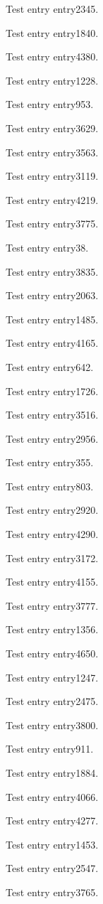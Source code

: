 Test entry \gls{entry2345}.

Test entry \gls{entry1840}.

Test entry \gls{entry4380}.

Test entry \gls{entry1228}.

Test entry \gls{entry953}.

Test entry \gls{entry3629}.

Test entry \gls{entry3563}.

Test entry \gls{entry3119}.

Test entry \gls{entry4219}.

Test entry \gls{entry3775}.

Test entry \gls{entry38}.

Test entry \gls{entry3835}.

Test entry \gls{entry2063}.

Test entry \gls{entry1485}.

Test entry \gls{entry4165}.

Test entry \gls{entry642}.

Test entry \gls{entry1726}.

Test entry \gls{entry3516}.

Test entry \gls{entry2956}.

Test entry \gls{entry355}.

Test entry \gls{entry803}.

Test entry \gls{entry2920}.

Test entry \gls{entry4290}.

Test entry \gls{entry3172}.

Test entry \gls{entry4155}.

Test entry \gls{entry3777}.

Test entry \gls{entry1356}.

Test entry \gls{entry4650}.

Test entry \gls{entry1247}.

Test entry \gls{entry2475}.

Test entry \gls{entry3800}.

Test entry \gls{entry911}.

Test entry \gls{entry1884}.

Test entry \gls{entry4066}.

Test entry \gls{entry4277}.

Test entry \gls{entry1453}.

Test entry \gls{entry2547}.

Test entry \gls{entry3765}.

